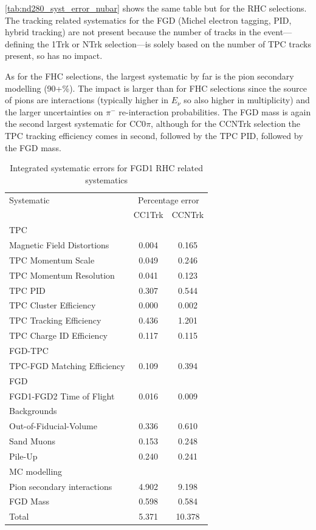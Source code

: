 \autoref{tab:nd280_syst_error_nubar} shows the same table but for the RHC selections. The tracking related systematics for the FGD (Michel electron tagging, PID, hybrid tracking) are not present because the number of tracks in the event---defining the 1Trk or NTrk selection---is solely based on the number of TPC tracks present, so has no impact.

As for the FHC selections, the largest systematic by far is the pion secondary modelling (90+\%). The impact is larger than for FHC selections since the source of pions are \numu interactions (typically higher in $E_\nu$ so also higher in multiplicity) and the larger uncertainties on $\pi^-$ re-interaction probabilities. The FGD mass is again the second largest systematic for CC0$\pi$, although for the CCNTrk selection the TPC tracking efficiency comes in second, followed by the TPC PID, followed by the FGD mass.
\begin{table}[h]
	\begin{tabular}{l | c c}
		\hline
		\hline
		Systematic & \multicolumn{2}{c}{Percentage error} \\
				   & CC1Trk & CCNTrk \\ 
		\hline	
		\multicolumn{3}{l}{TPC} \\
		Magnetic Field Distortions		& 0.004 & 0.165 \\
		TPC Momentum Scale				& 0.049 & 0.246 \\
		TPC Momentum Resolution			& 0.041 & 0.123 \\
		TPC PID							& 0.307 & 0.544 \\
		TPC Cluster Efficiency			& 0.000 & 0.002 \\
		TPC Tracking Efficiency			& 0.436 & 1.201 \\
		TPC Charge ID Efficiency		& 0.117 & 0.115 \\
		\hline 
		\multicolumn{3}{l}{FGD-TPC} \\
		TPC-FGD Matching Efficiency		& 0.109 & 0.394 \\
		\hline
		\multicolumn{3}{l}{FGD} \\
		FGD1-FGD2 Time of Flight		& 0.016 & 0.009 \\
		\hline
		\multicolumn{3}{l}{Backgrounds} \\
		Out-of-Fiducial-Volume			& 0.336 & 0.610 \\
		Sand Muons						& 0.153 & 0.248 \\
		Pile-Up							& 0.240 & 0.241 \\
		\hline
		\multicolumn{3}{l}{MC modelling} \\
		Pion secondary interactions		& 4.902 & 9.198 \\
		FGD Mass						& 0.598 & 0.584 \\
		\hline
		Total 							& 5.371 & 10.378 \\
		\hline
		\hline
	\end{tabular}
	\caption{Integrated systematic errors for FGD1 RHC related systematics}
	\label{tab:nd280_syst_error_nubar}
\end{table}

